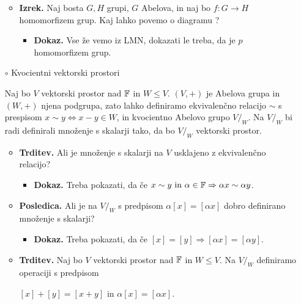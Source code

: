 \begin{enumerate}
\begin{itemize}
        \newpage
        \item \colorbox{blue!30}{\textbf{Izrek.}} Naj bosta $G, H$ grupi, $G$ Abelova, in naj bo $f: G \to H$ homomorfizem grup. Kaj lahko povemo o diagramu ?
        \begin{itemize}
            \item \colorbox{green!30}{\textbf{Dokaz.}} Vse že vemo iz LMN, dokazati le treba, da je $p$ homomorfizem grup.
        \end{itemize}
    \end{itemize}

    \item[$\circ$] Kvocientni vektorski prostori
    
    Naj bo $V$ vektorski prostor nad $\mathbb{F}$ in $W \leq V$. $(V,+)$ je Abelova grupa in $(W, +)$ njena podgrupa, zato lahko definiramo ekvivalenčno relacijo $\sim$ s prespisom $x \sim y \Leftrightarrow x-y \in W$, in kvocientno Abelovo grupo $V/_W$. Na $V/_W$ bi radi definirali množenje s skalarji tako, da bo $V/_W$ vektorski prostor.
    \begin{itemize}
        \item \colorbox{blue!30}{\textbf{Trditev.}} Ali je množenje s skalarji na $V$ usklajeno z ekvivalenčno relacijo?
        \begin{itemize}
            \item \colorbox{green!30}{\textbf{Dokaz.}} Treba pokazati, da če $x \sim y \text{ in } \alpha \in \mathbb{F} \Rightarrow \alpha x \sim \alpha y$.
        \end{itemize}
        \item \colorbox{orange!30}{\textbf{Posledica.}} Ali je na $V/_W$ s predpisom $\alpha [x] = [\alpha x]$ dobro definirano množenje s skalarji?
        \begin{itemize}
            \item \colorbox{green!30}{\textbf{Dokaz.}} Treba pokazati, da če $[x] = [y] \Rightarrow [\alpha x] = [\alpha y]$.
        \end{itemize}
        \item \colorbox{blue!30}{\textbf{Trditev.}} Naj bo $V$ vektorski prostor nad $\mathbb{F}$ in $W \leq V$. Na $V/_W$ definiramo operaciji s predpisom 
        
        $[x] + [y] = [x+y]$ in $\alpha [x] = [\alpha x]$.
        

\end{itemize}
\end{enumerate}
